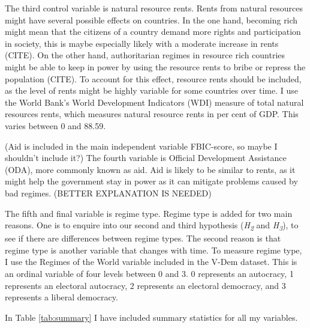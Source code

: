The third control variable is natural resource rents. Rents from natural resources might have several possible effects on countries. In the one hand, becoming rich might mean that the citizens of a country demand more rights and participation in society, this is maybe especially likely with a moderate increase in rents (CITE). On the other hand, authoritarian regimes in resource rich countries might be able to keep in power by using the resource rents to bribe or repress the population (CITE). To account for this effect, resource rents should be included, as the level of rents might be highly variable for some countries over time. I use the World Bank's World Development Indicators (WDI) measure of total natural resources rents, which measures natural resource rents in per cent of GDP. This varies between 0 and 88.59. 

(Aid is included in the main independent variable FBIC-score, so maybe I shouldn't include it?) The fourth variable is Official Development Assistance (ODA), more commonly known as aid. Aid is likely to be similar to rents, as it might help the government stay in power as it can mitigate problems caused by bad regimes. (BETTER EXPLANATION IS NEEDED)

The fifth and final variable is regime type. Regime type is added for two main reasons. One is to enquire into our second and third hypothesis (\textit{H\textsubscript{2}} and \textit{H\textsubscript{3}}), to see if there are differences between regime types. The second reason is that regime type is another variable that changes with time. To measure regime type, I use the Regimes of the World variable included in the V-Dem dataset. This is an ordinal variable of four levels between 0 and 3. 0 represents an autocracy, 1 represents an electoral autocracy, 2 represents an electoral democracy, and 3 represents a liberal democracy.

In Table \ref{tab:summary} I have included summary statistics for all my variables. 

